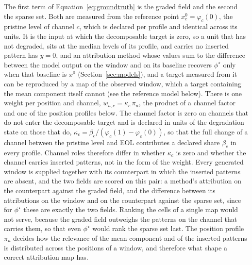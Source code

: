 \documentclass{article}
\newif\ifreview \reviewtrue        %
\newcommand{\rev}[1]{\ifreview\textcolor[HTML]{0B5FA5}{#1}\else#1\fi}
\newcommand{\revwhy}[1]{\ifreview\marginpar{\footnotesize\raggedright\textcolor[HTML]{0B5FA5}{#1}}\fi}
\begin{document}
\rev{The first term of Equation~\ref{eq:groundtruth} is the graded field and the second the sparse set. Both are measured from the reference point $x^{0}_{c} = \varphi_c(0)$, the pristine level of channel $c$, which is declared per profile and identical across its units. It is the input at which the decomposable target is zero, so a unit that has not degraded\rev{, sits at the median levels of its profile,} and carries no inserted pattern has $y = 0$\revwhy{X2: $x^0$ stays profile-level}, and an attribution method whose values sum to the difference between the model output on the window and on its baseline recovers $\phi^{\star}$ only when that baseline is $x^{0}$ (Section~\ref{sec:models}), and a target measured from it can be reproduced by a map of the observed window, which a target containing the mean component itself cannot (see the reference model below). There is one weight per position and channel, $w_{u,c} = \kappa_c\, \pi_u$, the product of a channel factor and one of the position profiles below. The channel factor is zero on channels that do not enter the decomposable target and is declared in units of the degradation state on those that do, $\kappa_c = \beta_c / (\varphi_c(1) - \varphi_c(0))$, so that the full change of a channel between the pristine level and EOL contributes a declared share $\beta_c$ in every profile. Channel roles therefore differ in whether $\kappa_c$ is zero and whether the channel carries inserted patterns, not in the form of the weight. \rev{Every generated window is supplied together with its counterpart in which the inserted patterns are absent, and the two fields are scored on this pair: a method's attribution on the counterpart against the graded field, and the difference between its attributions on the window and on the counterpart against the sparse set, since for $\phi^{\star}$ these are exactly the two fields. Ranking the cells of a single map would not serve, because the graded field outweighs the patterns on the channel that carries them, so that even $\phi^{\star}$ would rank the sparse set last.} The position profile $\pi_u$ decides how the relevance of the mean component and of the inserted patterns is distributed across the positions of a window, and therefore what shape a correct attribution map has.}\revwhy{C1: one weight per cell about $x^0$; D01: paired scoring}
\end{document}
